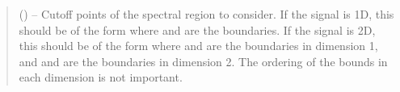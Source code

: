 \documentclass[letterpaper,10pt,english]{sphinxmanual}
\begin{document}
\begin{fulllineitems}
\begin{fulllineitems}
\begin{quote}
\begin{description}
\begin{itemize}
 (\sphinxstyleliteralemphasis{\sphinxupquote{{[}}}\sphinxstyleliteralemphasis{\sphinxupquote{{[}}}\sphinxstyleliteralemphasis{\sphinxupquote{, }}\sphinxstyleliteralemphasis{\sphinxupquote{{]}}}\sphinxstyleliteralemphasis{\sphinxupquote{{]}}}\sphinxstyleliteralemphasis{\sphinxupquote{, }}\sphinxstyleliteralemphasis{\sphinxupquote{{[}}}\sphinxstyleliteralemphasis{\sphinxupquote{{[}}}\sphinxstyleliteralemphasis{\sphinxupquote{, }}\sphinxstyleliteralemphasis{\sphinxupquote{{]}}}\sphinxstyleliteralemphasis{\sphinxupquote{, }}\sphinxstyleliteralemphasis{\sphinxupquote{{[}}}\sphinxstyleliteralemphasis{\sphinxupquote{, }}\sphinxstyleliteralemphasis{\sphinxupquote{{]}}}\sphinxstyleliteralemphasis{\sphinxupquote{{]}}}\sphinxstyleliteralemphasis{\sphinxupquote{, }}\sphinxstyleliteralemphasis{\sphinxupquote{{[}}}\sphinxstyleliteralemphasis{\sphinxupquote{{[}}}\sphinxstyleliteralemphasis{\sphinxupquote{, }}\sphinxstyleliteralemphasis{\sphinxupquote{{]}}}\sphinxstyleliteralemphasis{\sphinxupquote{{]} or        }}\sphinxstyleliteralemphasis{\sphinxupquote{{[}}}\sphinxstyleliteralemphasis{\sphinxupquote{{[}}}\sphinxstyleliteralemphasis{\sphinxupquote{, }}\sphinxstyleliteralemphasis{\sphinxupquote{{]}}}\sphinxstyleliteralemphasis{\sphinxupquote{, }}\sphinxstyleliteralemphasis{\sphinxupquote{{[}}}\sphinxstyleliteralemphasis{\sphinxupquote{, }}\sphinxstyleliteralemphasis{\sphinxupquote{{]}}}\sphinxstyleliteralemphasis{\sphinxupquote{{]}}}) – Cut\sphinxhyphen{}off points of the spectral region to consider.
If the signal is 1D, this should be of the form \sphinxtitleref{{[}{[}a,b{]}{]}}
where  and  are the boundaries.
If the signal is 2D, this should be of the form
\sphinxtitleref{{[}{[}a,b{]}, {[}c,d{]}{]}} where  and  are the boundaries in
dimension 1, and  and  are the boundaries in
dimension 2. The ordering of the bounds in each dimension is
not important.


\end{itemize}
\end{description}
\end{quote}
\end{fulllineitems}
\end{fulllineitems}
\end{document}
